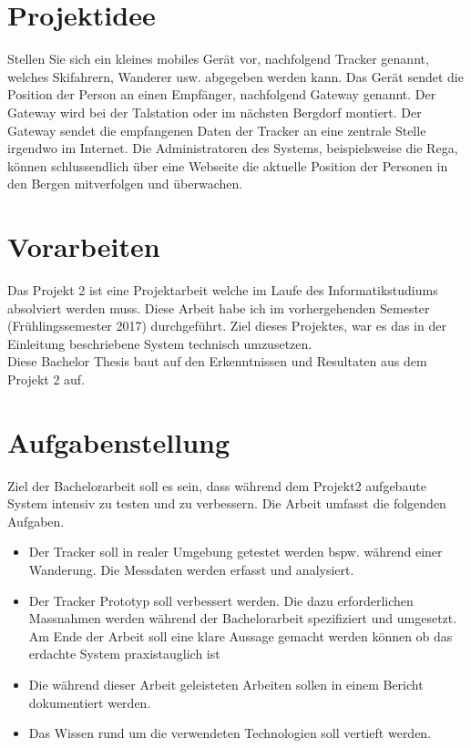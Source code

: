 \documentclass[11pt,english,german]{report}
\theoremstyle{definition}
\begin{document}
\newpage
\section{Projektidee}
Stellen Sie sich ein kleines mobiles Gerät vor, nachfolgend Tracker genannt, welches Skifahrern, Wanderer usw. abgegeben werden kann. Das Gerät sendet die Position der Person an einen Empfänger, nachfolgend Gateway genannt. Der Gateway wird bei der Talstation oder im nächsten Bergdorf montiert. Der Gateway sendet die empfangenen Daten der Tracker an eine zentrale Stelle irgendwo im Internet. Die Administratoren des Systems, beispielsweise die Rega, können schlussendlich über eine Webseite die aktuelle Position der Personen in den Bergen mitverfolgen und überwachen.

\section{Vorarbeiten}
Das Projekt 2 ist eine Projektarbeit welche im Laufe des Informatikstudiums absolviert werden muss. Diese Arbeit habe ich im vorhergehenden Semester (Frühlingssemester 2017) durchgeführt. Ziel dieses Projektes, war es das in der Einleitung beschriebene System technisch umzusetzen.\\[0.3cm]
Diese Bachelor Thesis baut auf den Erkenntnissen und Resultaten aus dem Projekt 2 auf.

\section{Aufgabenstellung}
Ziel der Bachelorarbeit soll es sein, dass während dem Projekt2 aufgebaute System intensiv zu testen und zu verbessern. Die Arbeit umfasst die folgenden Aufgaben.
\begin{itemize}
\item
Der Tracker soll in realer Umgebung getestet werden bspw. während einer Wanderung. Die Messdaten werden erfasst und analysiert.
\item Der Tracker Prototyp soll verbessert werden. Die dazu erforderlichen Massnahmen werden während der Bachelorarbeit spezifiziert und umgesetzt. Am Ende der Arbeit soll eine klare Aussage gemacht werden können ob das erdachte System praxistauglich ist
\item
Die während dieser Arbeit geleisteten Arbeiten sollen in einem Bericht dokumentiert werden.
\item Das Wissen rund um die verwendeten Technologien soll vertieft werden.
\end{itemize}
\end{document}

